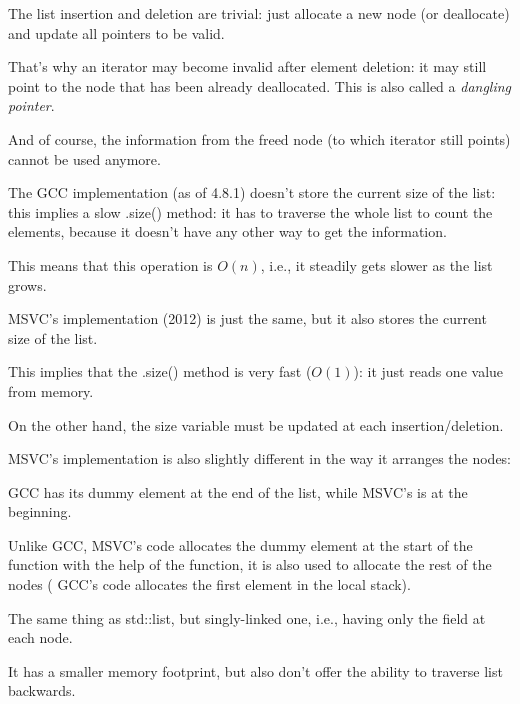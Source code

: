 The list insertion and deletion are trivial: just allocate a new node (or deallocate) and update all pointers
to be valid.

That's why an iterator may become invalid after element deletion: 
it may still point to the node that has been already deallocated.
This is also called a \emph{dangling pointer}.

And of course, the information from the freed node (to which iterator still points) 
cannot be used anymore.

The GCC implementation (as of 4.8.1) doesn't store the current size of the list: this implies a slow .size() method:
it has to traverse the whole list to count the elements, because it doesn't have any other way to get the information.

This means that this operation is $O(n)$, i.e., it steadily gets slower as the list grows.





\label{MSVC_std_list}

MSVC's implementation (2012) is just the same, but it also stores the current size of the list.

This implies that the .size() method is very fast ($O(1)$): it just reads one value from memory.

On the other hand, the size variable must be updated at each insertion/deletion.

MSVC's implementation is also slightly different in the way it arranges the nodes:



GCC has its dummy element at the end of the list, while MSVC's is at the beginning.



Unlike GCC, MSVC's code allocates the dummy element at the start of the function with the help of the  function,
it is also used to allocate the rest of the nodes (
GCC's code allocates the first element in the local stack).




The same thing as std::list, but singly-linked one, i.e., having only the  field at each node.

It has a smaller memory footprint, but also don't offer the ability to traverse list backwards.

